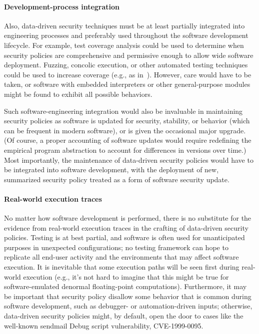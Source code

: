 \documentclass{IEEEtran}
\begin{document}
\paragraph*{Development-process integration}
Also,
data-driven security techniques must be 
at least partially integrated into engineering processes
and preferably used throughout the software development lifecycle.
For example,
test coverage analysis could be used to determine
when 
security policies are comprehensive and permissive enough to 
allow wide software deployment.
Fuzzing, concolic execution, or other automated testing techniques 
could be used to increase coverage (e.g., as in~\cite{MiningSandboxes}).
However, 
care would have to be taken, or software 
with embedded interpreters or other 
general-purpose modules
might be found to exhibit all possible behaviors.

Such software-engineering integration
would also be invaluable in maintaining security policies
as software is updated for security, stability, or behavior 
(which can be frequent in modern software),
or is given the occasional major upgrade.
(Of course, 
a proper accounting of software updates
would require redefining 
the empirical program abstraction
to account for differences in versions over time.)
Most importantly,
the maintenance of data-driven security policies would have to be
integrated into software development,
with the deployment of new, summarized security policy
treated as a form of software security update.


\paragraph*{Real-world execution traces}
No matter how software development is performed,
there is no substitute for 
the evidence from real-world execution traces
in the crafting of data-driven security policies.
Testing is at best partial, 
and software is often used for unanticipated purposes
in unexpected configurations;
no testing framework can hope to 
replicate all end-user activity and the environments
that may affect software execution.
It is inevitable that
some execution paths
will be seen first during real-world execution
(e.g., it's not hard to imagine that 
this might be true for
software-emulated denormal floating-point computations).
Furthermore,
it may be important 
that security policy disallow some behavior
that is common during software development,
such as debugger- or automation-driven inputs;
otherwise,
data-driven security policies
might, by default, open the door to
cases like the well-known sendmail Debug script vulnerability, CVE-1999-0095.
\end{document}
